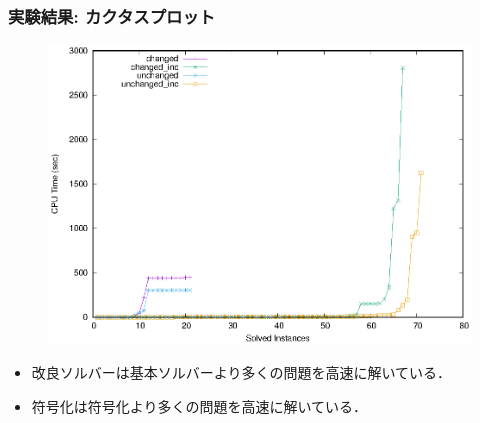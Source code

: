 \documentclass[dvipdfmx,11pt]{beamer}
\begin{document}
\begin{frame}\frametitle{実験結果: カクタスプロット}

  \begin{figure}[h]
    \centering
    \includegraphics[scale=0.6]{fig/cactus.eps}
  \end{figure}

  \begin{itemize}
    \item 改良ソルバーは基本ソルバーより多くの問題を高速に解いている．
    \item {}符号化は符号化より多くの問題を高速に解いている．
  \end{itemize}
  
\end{frame}
\end{document}
